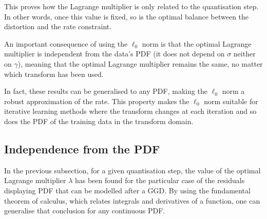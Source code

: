 \documentclass[11pt,a4paper,openright,twoside]{book}
\numberwithin{equation}{section} %
\numberwithin{figure}{section} %
\numberwithin{table}{section} %
\begin{document}
This proves how the Lagrange multiplier is only related to the quantisation
step.
In other words, once this value is fixed, so is the optimal balance between
the distortion and the rate constraint.

An important consequence of using the $\ell_0$ norm is that the optimal
Lagrange multiplier is independent from the data's \ac{PDF} (it does
not depend on $\sigma$ neither on $\gamma$), meaning that the optimal
Lagrange multiplier remains the same, no matter which transform has been
used.

In fact, these results can be generalised to any \ac{PDF}, making the
$\ell_0$ norm a robust approximation of the rate.
This property makes the $\ell_0$ norm suitable for iterative learning methods
where the transform changes at each iteration and so does the \ac{PDF} of the
training data in the transform domain.

\subsection{Independence from the \acs{PDF}}
\label{sub:independence_from_the_pdf}

In the previous subsection, for a given quantisation step, the value of
the optimal Lagrange multiplier $\lambda$ has been found for the particular
case of the residuals displaying \ac{PDF} that can be modelled after a
\ac{GGD}.
By using the fundamental theorem of calculus, which relates integrals
and derivatives of a function, one can generalise that conclusion for
any continuous \ac{PDF}.
\end{document}
